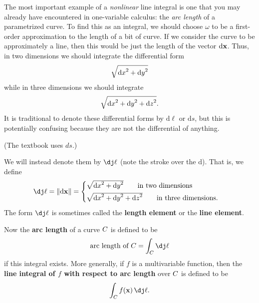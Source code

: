 \documentclass[12pt]{amsart}
\begin{document}
The most important example of a \emph{nonlinear} line integral is one that you may already have encountered in one-variable calculus: the \emph{arc length} of a parametrized curve.
To find this as an integral, we should choose $\omega$ to be a first-order approximation to the length of a bit of curve.
If we consider the curve to be approximately a line, then this would be just the length of the vector ${\mathrm{d} \mathbf{x}}$.
Thus, in two dimensions we should integrate the differential form
\[ \sqrt{{\mathrm{d} x}^2+{\mathrm{d} y}^2}\]
while in three dimensions we should integrate
\[ \sqrt{{\mathrm{d} x}^2+{\mathrm{d} y}^2 + {\mathrm{d} z}^2}.\]
It is traditional to denote these differential forms by $\mathrm{d}\ell$ or $\mathrm{d}s$, but this is potentially confusing because they are not the differential of anything.
\begin{stewart}(The textbook uses $ds$.)\end{stewart}
We will instead denote them by $\dl$ (note the stroke over the $\mathrm{d}$).
That is, we define
\[ \dl = \mgn{\dpx} =
\begin{cases}
  \sqrt{\dx^2+\dy^2}\qquad\text{in two dimensions}\\[3pt]
  \sqrt{\dx^2+\dy^2+\dz^2}\qquad\text{in three dimensions}.
\end{cases}\]
The form $\dl$ is sometimes called the \textbf{length element} or the \textbf{line element}.

Now the \textbf{arc length} of a curve $C$ is defined to be
\[ \text{arc length of } \curve = \lint{\curve} \dl \]
if this integral exists.
More generally, if $f$ is a multivariable function, then the \textbf{line integral of $f$ with respect to arc length} over $C$ is defined to be
\[ \lint{\curve} f(\ptx)\,\dl. \]
\end{document}
